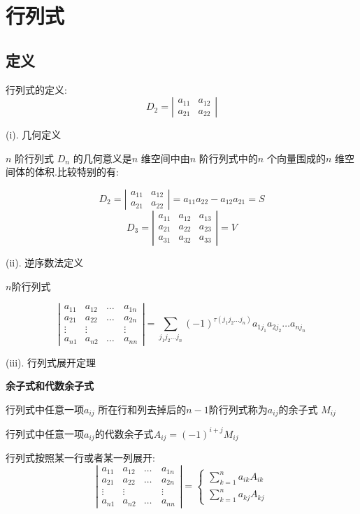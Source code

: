 
\chapter{行列式}
\section{定义}
\begin{definition}
	行列式的定义:  
	$$D_{2}=\left|\begin{array}{ll}
		a_{11}&a_{12}\\a_{21}&a_{22}
	\end{array} \right| $$
\end{definition}
(i). 几何定义

$n$ 阶行列式 $D_{n}$ 的几何意义是$n$ 维空间中由$n$ 阶行列式中的$n$ 个向量围成的$n$ 维空间体的体积.比较特别的有:  

$$D_{2}=\left|\begin{array}{ll}
	a_{11}&a_{12}\\a_{21}&a_{22}
\end{array} \right|=a_{11}a_{22}-a_{12}a_{21}=S$$
$$D_{3}=\left|\begin{array}{lll}
	a_{11}&a_{12}&a_{13}\\a_{21}&a_{22}&a_{23}\\a_{31}&a_{32}&a_{33}
\end{array} \right|=V$$

(ii). 逆序数法定义

$n$阶行列式

$$\left|\begin{matrix}
	a_{11}&a_{12}&\dots&a_{1n}\\
	a_{21}&a_{22}&\dots&a_{2n}\\
	\vdots&\vdots&\quad&\vdots\\
	a_{n1}&a_{n2}&\dots&a_{nn}
\end{matrix} \right|=\sum\limits_{j_{1}j_{2}\dots j_{n}}(-1)^{\tau(j_{1}j_{2}\dots j_{n})}a_{1j_{1}}a_{2j_{2}}\dots a_{n j_{n}}$$

(iii). 行列式展开定理

\textbf{余子式和代数余子式}

行列式中任意一项$a_{ij}$ 所在行和列去掉后的$n-1$阶行列式称为$a_{ij}$的余子式 $M_{ij}$

行列式中任意一项$a_{ij}$的代数余子式$A_{ij}=(-1)^{i+j}M_{ij}$

行列式按照某一行或者某一列展开:  
$$\left|\begin{matrix}
	a_{11}&a_{12}&\dots&a_{1n}\\
	a_{21}&a_{22}&\dots&a_{2n}\\
	\vdots&\vdots&\quad&\vdots\\
	a_{n1}&a_{n2}&\dots&a_{nn}
\end{matrix} \right|=\left\lbrace
\begin{array}{l}
	\sum\limits_{k=1}^{n}a_{ik}A_{ik}\\\sum\limits_{k=1}^{n}a_{kj}A_{kj}
\end{array} \right. $$

